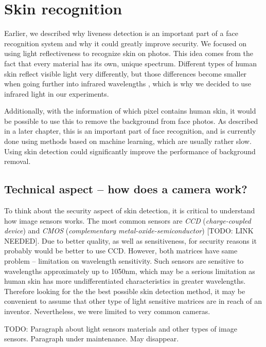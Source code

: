 \chapter{Skin recognition}
    Earlier, we described why liveness detection is an important part
    of a face recognition system and why it could greatly improve security.
    We focused on using light reflectiveness to recognize skin on photos.
    This idea comes from the fact that every material has its own, unique spectrum.
    Different types of human skin reflect visible light very differently,
    but those differences become smaller when going further into infrared wavelengths
    \cite{visinfra} \cite{toyotaskin}, which is why we decided to use infrared light
    in our experiments.

    Additionally, with the information of which pixel contains human skin,
    it would be possible to use this to remove the background from face photos.
    As described in a later chapter, this is an important part of face recognition,
    and is currently done using methods based on machine learning, which are usually
    rather slow.
    Using skin detection could significantly improve the performance of background
    removal.

    \section{Technical aspect -- how does a camera work?}
        To think about the security aspect of skin detection,
        it is critical to understand how image sensors works.
        The most common sensors are \textit{CCD} (\textit{charge-coupled device})
        and \textit{CMOS} (\textit{complementary metal-oxide-semiconductor})
        [TODO: LINK NEEDED].
        Due to better quality, as well as sensitiveness, for security reasons
        it probably would be better to use CCD.
        However, both matrices have same problem -- limitation on wavelength sensitivity.
        Such sensors are sensitive to wavelengths approximately up to 1050nm,
        which may be a serious limitation as human skin has more undifferentiated
        characteristics in greater wavelengths.
        Therefore looking for the the best possible skin detection method,
        it may be convenient to assume that other type of light sensitive matrices
        are in reach of an inventor.
        Nevertheless, we were limited to very common cameras.

        TODO: Paragraph about light sensors materials and other types of image sensors.
        Paragraph under maintenance. May disappear.

